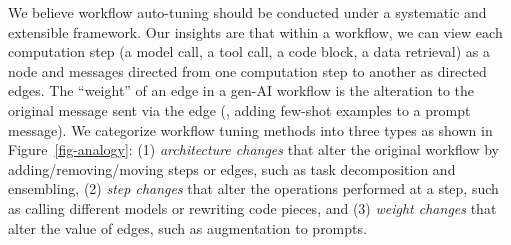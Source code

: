 We believe workflow auto-tuning should be conducted under a systematic and extensible framework. %
Our insights are that within a workflow, we can view each computation step (a model call, a tool call, a code block, a data retrieval) 
as a node and messages directed from one computation step to another %
as directed edges. The ``weight'' of an edge in a gen-AI workflow is the alteration to the original message sent via the edge (\eg, adding few-shot examples to a prompt message). 
We categorize workflow tuning methods into three types as shown in Figure~\ref{fig-analogy}:
(1) {\em architecture changes} that alter the original workflow by adding/removing/moving steps or edges, such as task decomposition and ensembling,
(2) {\em step changes} that alter the operations performed at a step, such as calling different models or rewriting code pieces,
and (3) {\em weight changes} that alter the value of edges, such as augmentation to prompts.




